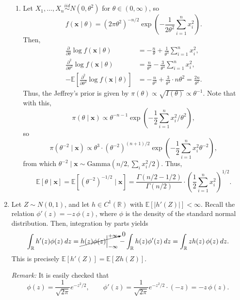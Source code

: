 \documentclass[11pt]{article}
\newcommand{\R}{\mathbb{R}}
\newcommand{\EE}{\mathbb{E}}
\newcommand{\iid}{\overset{iid}{\sim}}
\begin{document}
\begin{enumerate}
\begin{enumerate}
            \item Let $X_1, \dots, X_n \iid N(0, \theta^2)$ for $\theta \in (0,
            \infty)$, so \[
                f(\bm{x} \mid \theta) = (2\pi\theta^2)^{-n / 2} \exp\left(-\frac{1}{2\theta^2} \sum_{i = 1}^n x_i^2\right).
            \] Then, \begin{align*}
                \frac{\partial}{\partial \theta} \log{f(\bm{x}\mid \theta)}
                    &= -\frac{n}{\theta} + \frac{1}{\theta^3} \sum_{i = 1}^n x_i^2, \\
                \frac{\partial^2}{\partial \theta^2} \log{f(\bm{x}\mid \theta)}
                    &= \frac{n}{\theta^2} - \frac{3}{\theta^4} \sum_{i = 1}^n x_i^2, \\
                -\EE\left[\frac{\partial^2}{\partial \theta^2}  \log{f(\bm{x}\mid \theta)} \right]
                    &= -\frac{n}{\theta^2} + \frac{3}{\theta^4} \cdot n\theta^2 = \frac{2n}{\theta^2}.
            \end{align*}
            Thus, the Jeffrey's prior is given by $\pi(\theta) \propto
            \sqrt{I(\theta)} \propto \theta^{-1}$.
            Note that with this, \[
                \pi(\theta\mid \bm{x}) \propto \theta^{-n - 1} \exp\left(-\frac{1}{2}\sum_{i = 1}^n x_i^2 / \theta^2\right),
            \] so \[
                \pi(\theta^{-2}\mid \bm{x}) \propto \theta^3 \cdot (\theta^{-2})^{(n + 1) / 2} \exp\left(-\frac{1}{2}\sum_{i = 1}^n x_i^2 \theta^{-2}\right),
            \] from which $\theta^{-2} \mid \bm{x} \sim \text{Gamma}(n / 2,
            \sum_i x_i^2 / 2)$.
            Thus, \[
                \EE[\theta\mid \bm{x}]
                    = \EE[(\theta^{-2})^{-1 / 2}\mid \bm{x}]
                    = \frac{\Gamma(n/2 - 1/2)}{\Gamma(n/2)} \cdot \left(\frac{1}{2}\sum_{i = 1}^n x_i^2\right)^{1 / 2}.
            \] 
        \end{enumerate}


        \item Let $Z \sim N(0, 1)$, and let $h \in C^1(\R)$ with $\EE[|h'(Z)|]
        < \infty$.
        Recall the relation $\phi'(z) = -z\,\phi(z)$, where $\phi$ is the density
        of the standard normal distribution.
        Then, integration by parts yields \[
            \int_\R h'(z) \phi(z)\:dz
                = \cancelto{0}{h(z) \phi(z) \Big|_{-\infty}^{+\infty}} - \int_\R h(z) \phi'(z)\:dz
                = \int_\R zh(z)\,\phi(z)\:dz.
        \] This is precisely $\EE[h'(Z)] = \EE[Z h(Z)]$.

        \emph{Remark:} It is easily checked that \[
            \phi(z)
                = \frac{1}{\sqrt{2\pi}} e^{-z^2 /2}, \qquad
            \phi'(z)
                = \frac{1}{\sqrt{2\pi}} e^{-z^2 /2} \cdot (-z)
                = - z\,\phi(z).
        \]


\end{enumerate}
\end{document}
